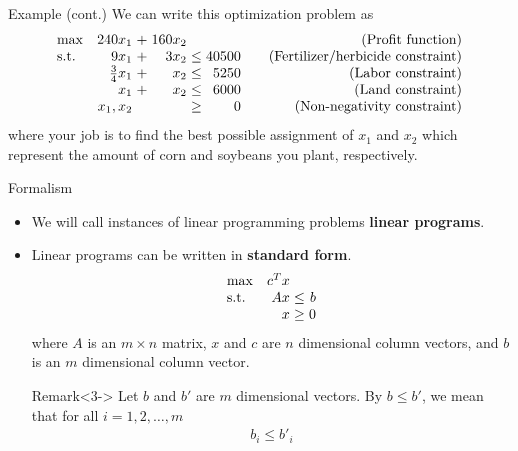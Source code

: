 \documentclass{beamer}
\begin{document}
\begin{frame}{Example (cont.)}
    We can write this optimization problem as
    \begin{equation*}
    \setlength\arraycolsep{1.5pt}
      \begin{array}{l@{\quad} r c r c r @{\quad\quad} r}
        \max          & 240x_1 & + &         160x_2 &      &    & \text{(Profit function)} \\
        \mathrm{s.t.} &   9x_1 & + &           3x_2 & \leq & 40500 & \text{(Fertilizer/herbicide constraint)}\\
                      &    \frac{3}{4}x_1 & + &           x_2 & \leq &  5250 & \text{(Labor constraint)}\\
                      & x_1 & + & x_2 & \leq & 6000 & \text{(Land constraint)}\\
                      &    x_1, x_2 &  & & \geq &  0 & \text{(Non-negativity constraint)}\\
      \end{array}
    \end{equation*}
    where your job is to find the best possible assignment of $x_1$ and $x_2$ which represent the amount of corn and soybeans you plant, respectively.
\end{frame}

\begin{frame}{Formalism}
    \begin{itemize}
        \item<1-> We will call instances of linear programming problems \textbf{linear programs}.
        \item<2-> Linear programs can be written in \textbf{standard form}.
        \begin{equation*}
            \setlength\arraycolsep{1.5pt}
            \begin{array}{l@{\quad} r c r} 
                \max          & c^{T}x & & \\
                \mathrm{s.t.} &  Ax & \leq & b \\
                              & x & \geq &  0 \\
            \end{array}
        \end{equation*}
        where $A$ is an $m \times n$ matrix, $x$ and $c$ are $n$ dimensional column vectors, and $b$ is an $m$ dimensional column vector.
        
        \begin{block}{Remark}<3->
            Let $b$ and $b'$ are $m$ dimensional vectors. By $b \leq b'$, we mean that for all $i = 1, 2, \ldots, m$
            \begin{align*}
                b_i \leq b'_i
            \end{align*}
        \end{block}
    \end{itemize}
\end{frame}
\end{document}
